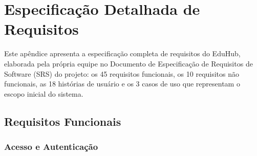 \chapter{Especificação Detalhada de Requisitos}\label{apx:requisitos}

Este apêndice apresenta a especificação completa de requisitos do EduHub,
elaborada pela própria equipe no Documento de Especificação de Requisitos de
Software (SRS) do projeto: os 45 requisitos funcionais, os 10 requisitos não
funcionais, as 18 histórias de usuário e os 3 casos de uso que representam o
escopo inicial do sistema.

\section{Requisitos Funcionais}

\subsection{Acesso e Autenticação}

